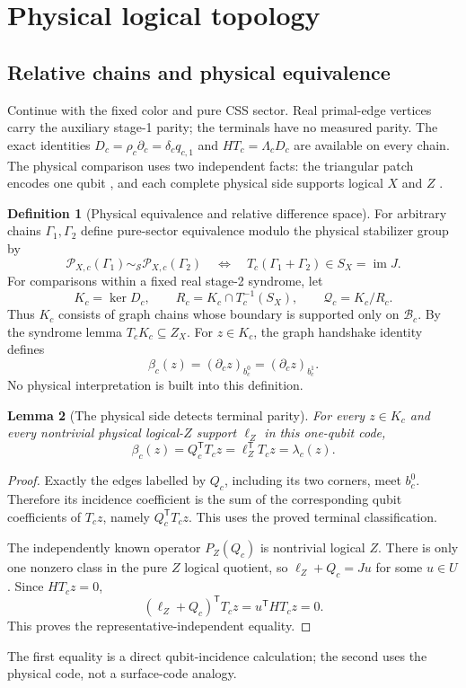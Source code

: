 \documentclass[11pt]{article}
\theoremstyle{definition}
\newtheorem{definition}{Definition}[section]
\theoremstyle{plain}
\newtheorem{lemma}[definition]{Lemma}
\theoremstyle{remark}
\begin{document}
\section{Physical logical topology}\label{sec:logical}
\subsection{Relative chains and physical equivalence}
Continue with the fixed color and pure CSS sector. Real primal-edge
vertices carry the auxiliary stage-1 parity; the terminals have no
measured parity. The exact identities
$D_c=\rho_c\partial_c=\delta_cq_{c,1}$ and $HT_c=\Lambda_cD_c$
are available on every chain.
The physical comparison uses two independent facts:
the triangular patch encodes one qubit
\cite[p.~3, triangular-code construction]{Bombin}, and each complete
physical side supports logical $X$ and $Z$
\cite[Sec.~2.1, p.~4]{Lee}.

\begin{definition}[Physical equivalence and relative difference space]
\label{def:equivalence}
For arbitrary chains $\Gamma_1,\Gamma_2$ define pure-sector equivalence
modulo the physical stabilizer group by
\[
 \mathscr P_{X,c}(\Gamma_1)\sim_{\mathcal S}
 \mathscr P_{X,c}(\Gamma_2)
 \quad\Longleftrightarrow\quad
 T_c(\Gamma_1+\Gamma_2)\in S_X=\operatorname{im}J .
\]
For comparisons within a fixed real stage-2 syndrome, let
\[
 K_c=\ker D_c,\qquad
 R_c=K_c\cap T_c^{-1}(S_X),\qquad \mathcal Q_c=K_c/R_c .
\]
Thus $K_c$ consists of graph chains whose boundary is supported only
on $\mathcal B_c$. By the syndrome lemma $T_cK_c\subseteq Z_X$.
For $z\in K_c$, the graph handshake identity defines
\[
 \beta_c(z)=(\partial_cz)_{b_c^0}=(\partial_cz)_{b_c^1}.
\]
No physical interpretation is built into this definition.
\end{definition}

\begin{lemma}[The physical side detects terminal parity]\label{lem:sideparity}
For every $z\in K_c$ and every nontrivial physical logical-$Z$ support
$\ell_Z$ in this one-qubit code,
\begin{equation}
 \beta_c(z)=Q_c^{\mathsf T}T_cz
          =\ell_Z^{\mathsf T}T_cz=\lambda_c(z).
 \label{eq:target}
\end{equation}
\end{lemma}
\begin{proof}
Exactly the edges labelled by $Q_c$, including its two corners, meet
$b_c^0$. Therefore its incidence coefficient is the sum of the
corresponding qubit coefficients of $T_cz$, namely
$Q_c^{\mathsf T}T_cz$. This uses the proved terminal classification.

The independently known operator $P_Z(Q_c)$ is nontrivial logical $Z$.
There is only one nonzero class in the pure $Z$ logical quotient, so
$\ell_Z+Q_c=Ju$ for some $u\in U$. Since $HT_cz=0$,
\[
 (\ell_Z+Q_c)^{\mathsf T}T_cz
       =u^{\mathsf T}HT_cz=0.
\]
This proves the representative-independent equality.
\end{proof}
The first equality is a direct qubit-incidence calculation; the second
uses the physical code, not a surface-code analogy.
\end{document}
